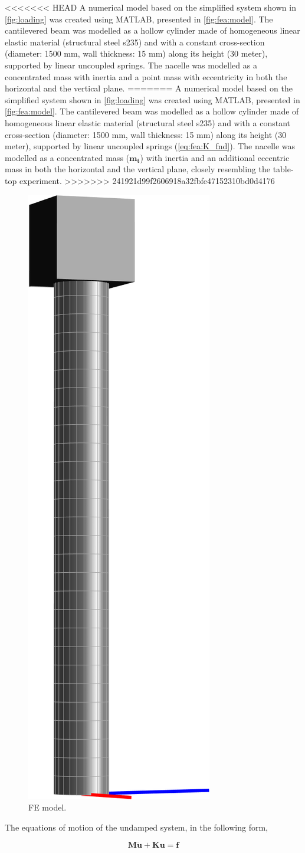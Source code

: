 \documentclass{article}
\begin{document}
<<<<<<< HEAD
A numerical model based on the simplified system shown in \autoref{fig:loading} was created using MATLAB, presented in \autoref{fig:fea:model}. The cantilevered beam was modelled as a hollow cylinder made of  homogeneous linear elastic material (structural steel s235) and with a constant cross-section (diameter: 1500 mm, wall thickness: 15 mm) along its height (30 meter), supported by linear uncoupled springs.  The nacelle was modelled as a concentrated mass with inertia and a point mass with eccentricity in both the horizontal and the vertical plane.
=======
A numerical model based on the simplified system shown in \autoref{fig:loading} was created using MATLAB, presented in \autoref{fig:fea:model}. The cantilevered beam was modelled as a hollow cylinder made of  homogeneous linear elastic material (structural steel s235) and with a constant cross-section (diameter: 1500 mm, wall thickness: 15 mm) along its height (30 meter), supported by linear uncoupled springs (\autoref{eq:fea:K_fnd}).  The nacelle was modelled as a concentrated mass ($\mathbf{m_{t}}$) with inertia and an additional eccentric mass in both the horizontal and the vertical plane, closely resembling the table-top experiment.
>>>>>>> 241921d99f2606918a32fbfe47152310bd0d4176

\begin{figure}[ht]
    \centering
    \includegraphics[width=0.15\linewidth]{figures/FEModel.png}
    \caption{FE model.}
    \label{fig:fea:model}
\end{figure}

The equations of motion of the undamped system, in the following form,

\begin{equation}
    \mathbf{M\ddot{\mathbf{u}}}+\mathbf{K}\mathbf{u} = \mathbf{f}
    \label{eq:fea:system}
\end{equation}
\end{document}
